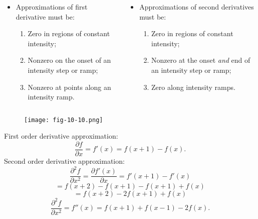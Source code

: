 \begin{frame}
\begin{columns}
\begin{column}{.5\textwidth}
\begin{itemize}
\item Approximations of first derivative must be:
\begin{enumerate}
\item Zero in regions of constant intensity;
\item Nonzero on the onset of an intensity step or ramp;
\item Nonzero at points along an intensity ramp.
\end{enumerate}
\end{itemize}
\end{column}
\begin{column}{.5\textwidth}
\begin{itemize}
\item Approximations of second derivatives must be:
\begin{enumerate}
\item Zero in regions of constant intensity;
\item Nonzero at the onset \textit{and} end of an intensity step or ramp;
\item Zero along intensity ramps.
\end{enumerate}
\end{itemize}
\end{column}
\end{columns}
\end{frame}

\begin{frame}
\begin{figure}[!h]
\texttt{[image: fig-10-10.png]}
\end{figure}
\end{frame}

\begin{frame}
First order derivative approximation:
\begin{equation}
\dfrac{\partial f}{\partial x} = f'(x) = f(x+1) - f(x).
\end{equation}
Second order derivative approximation:
\[
\dfrac{\partial^{2}f}{\partial x^{2}} = \dfrac{\partial f'(x)}{\partial x} = f'(x+1) - f'(x)
\]
\[
= f(x+2) - f(x+1) - f(x+1) + f(x)
\]
\[
= f(x+2) -2f(x+1) + f(x)
\]
\begin{equation}
\dfrac{\partial^{2}f}{\partial x^{2}} = f''(x) = f(x+1) + f(x-1) - 2 f(x).
\end{equation}
\end{frame}

